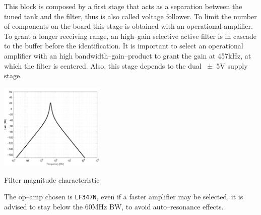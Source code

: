 This block is composed by a first stage that acts as a separation between the tuned tank and the filter, thus is also called voltage follower. To limit the number of components on the board this stage is obtained with an operational amplifier. To grant a longer receiving range, an high--gain selective active filter is in cascade to the buffer before the identification. It is important to select an operational amplifier with an high bandwidth--gain--product to grant the gain at \num{457}\si{\kilo\hertz}, at which the filter is centered. Also, this stage depends to the dual \num{\pm 5}\si{\volt} supply stage. 
\begin{marginfigure}
	\centering
	\includegraphics[width=5cm]{ch2/img/filter1.pdf}
	\caption{Filter magnitude characteristic}
\end{marginfigure}

The op--amp chosen is \texttt{LF347N}, even if a faster amplifier may be selected, it is advised to stay below the \num{60}\si{\mega\hertz} BW, to avoid auto--resonance effects.

